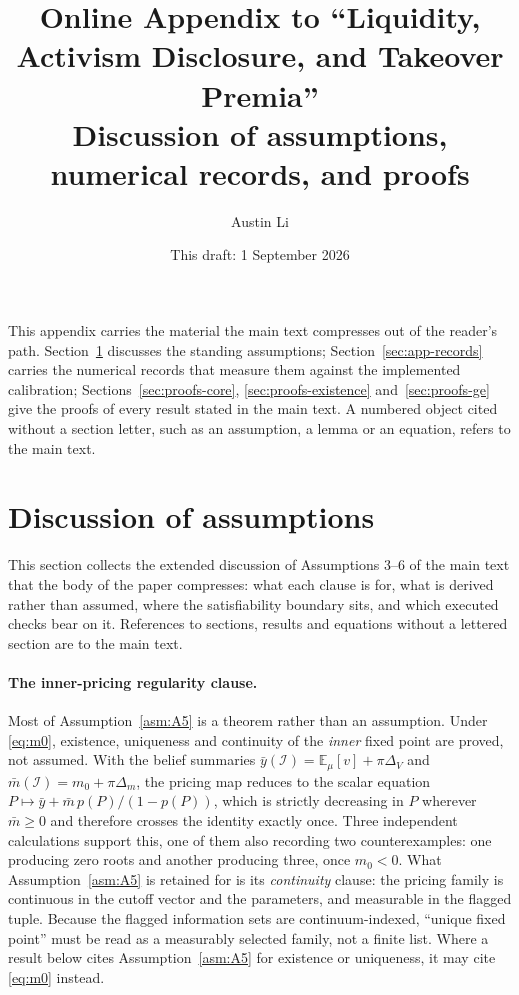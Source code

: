 \documentclass[11pt]{article}
\title{\textbf{Online Appendix to ``Liquidity, Activism Disclosure, and Takeover
Premia''}\\[0.3em]
\large Discussion of assumptions, numerical records, and proofs}
\author{Austin Li\\[0.25em]}
\date{This draft: 1 September 2026}
\newcommand{\Eop}{\mathbb{E}}
\begin{document}
\maketitle

\noindent This appendix carries the material the main text compresses out of the reader's path.
Section~\ref{sec:app-assumptions} discusses the standing assumptions; Section~\ref{sec:app-records}
carries the numerical records that measure them against the implemented calibration;
Sections~\ref{sec:proofs-core}, \ref{sec:proofs-existence} and~\ref{sec:proofs-ge} give the proofs
of every result stated in the main text. A numbered object cited without a section letter, such as
an assumption, a lemma or an equation, refers to the main text.

\bigskip

\appendix
\section{Discussion of assumptions}
\label{sec:app-assumptions}

\noindent This section collects the extended discussion of Assumptions 3--6 of the main text that
the body of the paper compresses: what each clause is for, what is derived rather than assumed,
where the satisfiability boundary sits, and which executed checks bear on it. References to
sections, results and equations without a lettered section are to the main text.

\paragraph{The inner-pricing regularity clause.}
Most of Assumption~\ref{asm:A5} is a theorem rather than an
assumption. Under \eqref{eq:m0}, existence, uniqueness and continuity of the \emph{inner} fixed point
are proved, not assumed. With the belief summaries $\bar y(\mathcal I) = \Eop_\mu[v] + \pi\Delta_V$
and $\bar m(\mathcal I) = m_0 + \pi\Delta_m$, the pricing map reduces to the scalar equation
$P \mapsto \bar y + \bar m\,p(P)/(1-p(P))$, which is strictly decreasing in $P$ wherever
$\bar m \ge 0$ and therefore crosses the identity exactly once. Three independent calculations
support this, one of them also recording two counterexamples: one producing zero roots and another
producing three, once $m_0 < 0$. What Assumption~\ref{asm:A5} is retained for is its \emph{continuity} clause: the
pricing family is continuous in the cutoff vector and the parameters, and measurable in the flagged
tuple. Because the flagged information sets are continuum-indexed, ``unique fixed point'' must be
read as a measurably selected family, not a finite list. Where a result below cites
Assumption~\ref{asm:A5} for existence or uniqueness, it may cite \eqref{eq:m0} instead.
\end{document}
